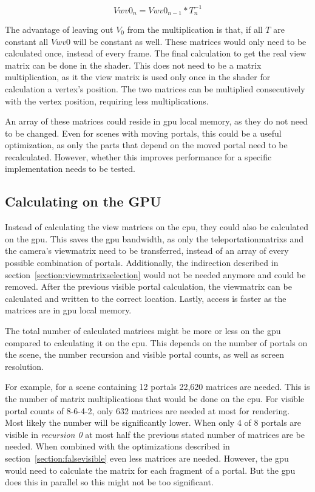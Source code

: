$$Vwv0_n = Vwv0_{n-1} * T_n^{-1}$$

The advantage of leaving out $V_0$ from the multiplication is that, if all $T$ are constant all $Vwv0$ will be constant as well. These matrices would only need to be calculated once, instead of every frame. The final calculation to get the real view matrix can be done in the shader. This does not need to be a matrix multiplication, as it the view matrix is used only once in the shader for calculation a vertex's position. The two matrices can be multiplied consecutively with the vertex position, requiring less multiplications.

An array of these matrices could reside in \gls{gpu} local memory, as they do not need to be changed. Even for scenes with moving portals, this could be a useful optimization, as only the parts that depend on the moved portal need to be recalculated. However, whether this improves performance for a specific implementation needs to be tested.

\subsection{Calculating on the GPU}
Instead of calculating the view matrices on the \gls{cpu}, they could also be calculated on the \gls{gpu}.
This saves the \gls{gpu} bandwidth, as only the \glspl{teleportationmatrix}  and the camera's \gls{viewmatrix} need to be transferred, instead of an array of every possible combination of portals. Additionally, the indirection described in section~\ref{section:viewmatrixselection} would not be needed anymore and could be removed. After the previous visible portal calculation, the \gls{viewmatrix} can be calculated and written to the correct location. Lastly, access is faster as the matrices are in \gls{gpu} local memory.

The total number of calculated matrices might be more or less on the \gls{gpu} compared to calculating it on the \gls{cpu}. This depends on the number of portals on the scene, the number recursion and visible portal counts, as well as screen resolution. 

For example, for a scene containing 12 portals 22,620 matrices are needed. This is the number of matrix multiplications that would be done on the \gls{cpu}. For visible portal counts of 8-6-4-2, only 632 matrices are needed at most for rendering. Most likely the number will be significantly lower. When only 4 of 8 portals are visible in \textit{recursion 0} at most half the previous stated number of matrices are be needed. When combined with the optimizations described in section~\ref{section:falsevisible} even less matrices are needed. However, the \gls{gpu} would need to calculate the matrix for each fragment of a portal. But the \gls{gpu} does this in parallel so this might not be too significant.

